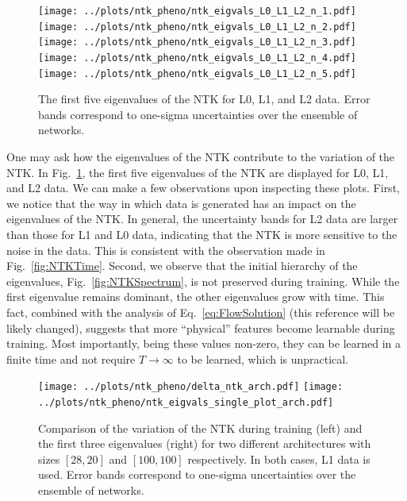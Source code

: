 \begin{figure}[h!]
  \centering
  \texttt{[image: ../plots/ntk\_pheno/ntk\_eigvals\_L0\_L1\_L2\_n\_1.pdf]}
  \texttt{[image: ../plots/ntk\_pheno/ntk\_eigvals\_L0\_L1\_L2\_n\_2.pdf]}
  \texttt{[image: ../plots/ntk\_pheno/ntk\_eigvals\_L0\_L1\_L2\_n\_3.pdf]}
  \texttt{[image: ../plots/ntk\_pheno/ntk\_eigvals\_L0\_L1\_L2\_n\_4.pdf]}
  \texttt{[image: ../plots/ntk\_pheno/ntk\_eigvals\_L0\_L1\_L2\_n\_5.pdf]}
  \vspace{0.5cm}
  \caption{The first five eigenvalues of the NTK for L0, L1, and L2 data. Error
  bands correspond to one-sigma uncertainties over the ensemble of networks.}
  \label{fig:EigvalsComparison}
\end{figure}
One may ask how the eigenvalues of the NTK contribute to the variation of the
NTK. In Fig.~\ref{fig:EigvalsComparison}, the first five eigenvalues of the NTK
are displayed for L0, L1, and L2 data. We can make a few observations upon
inspecting these plots. First, we notice that the way in which data is generated
has an impact on the eigenvalues of the NTK. In general, the uncertainty bands
for L2 data are larger than those for L1 and L0 data, indicating that the NTK is
more sensitive to the noise in the data. This is consistent with the observation
made in Fig.~\ref{fig:NTKTime}. Second, we observe that the initial hierarchy of
the eigenvalues, Fig.~\ref{fig:NTKSpectrum}, is not preserved during training.
While the first eigenvalue remains dominant, the other eigenvalues grow with
time. This fact, combined with the analysis of Eq.~\eqref{eq:FlowSolution}
\ac{(this reference will be likely changed)}, suggests that more ``physical''
features become learnable during training. Most importantly, being these values
non-zero, they can be learned in a finite time and not require
$T\rightarrow\infty$ to be learned, which is unpractical.

\begin{figure}[h!]
  \centering
  \texttt{[image: ../plots/ntk\_pheno/delta\_ntk\_arch.pdf]}
  \texttt{[image: ../plots/ntk\_pheno/ntk\_eigvals\_single\_plot\_arch.pdf]}
  \caption{Comparison of the variation of the NTK during training (left) and the
  first three eigenvalues (right) for two different architectures with sizes
  $[28,20]$ and $[100,100]$ respectively. In both cases, L1 data is used. Error
  bands correspond to one-sigma uncertainties over the ensemble of networks.}
  \label{fig:NTKTimeDiffArch}
\end{figure}

